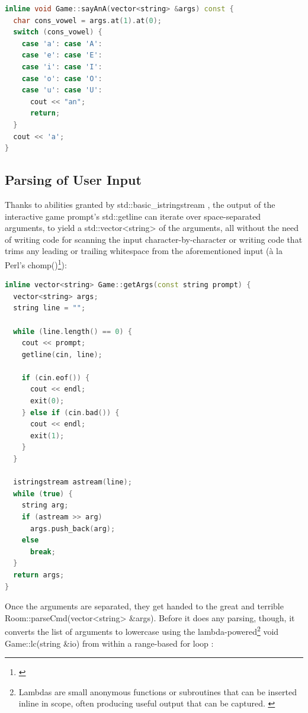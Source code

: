 \documentclass[man,12pt]{apa6}
\begin{document}
\begin{framed}
\begin{lstlisting}[language=C++]
inline void Game::sayAnA(vector<string> &args) const {
  char cons_vowel = args.at(1).at(0);
  switch (cons_vowel) {
    case 'a': case 'A':
    case 'e': case 'E':
    case 'i': case 'I':
    case 'o': case 'O':
    case 'u': case 'U':
      cout << "an";
      return;
  }
  cout << 'a';
}
\end{lstlisting}
\end{framed}

\subsection{Parsing of User Input}
Thanks to abilities granted by \textsf{std::basic\_istringstream}
\parencite{iss-cpp},
the output of the interactive game prompt's \textsf{std::getline} can
iterate over space-separated arguments, to yield a
\textsf{std::vector<string>} of  the arguments, all without the need of writing code
for scanning the input character-by-character or writing code that trims any
leading or trailing whitespace from the aforementioned input (à la Perl's \textsf{chomp()}\footnote{\cite{chomp-perldoc}}):

\begin{framed}
\begin{lstlisting}[language=C++]
inline vector<string> Game::getArgs(const string prompt) {
  vector<string> args;
  string line = "";

  while (line.length() == 0) {
    cout << prompt;
    getline(cin, line);

    if (cin.eof()) {
      cout << endl;
      exit(0);
    } else if (cin.bad()) {
      cout << endl;
      exit(1);
    }
  }

  istringstream astream(line);
  while (true) {
    string arg;
    if (astream >> arg)
      args.push_back(arg);
    else
      break;
  }
  return args;
}
\end{lstlisting}
\end{framed}

Once the arguments are separated, they get handed to the great and terrible
\textsf{Room::parseCmd(vector<string> \&args)}.  Before it does any parsing,
though, it converts the list of arguments to lowercase using the
lambda-powered\footnote{Lambdas are small anonymous functions or subroutines
that can be inserted inline in scope, often producing useful output that can be
captured. \parencite{lambda-cpp}} \textsf{void Game::lc(string \&io)} from within
a range-based \textsf{for} loop \parencite{rangeloop-cpp}:
\end{document}
